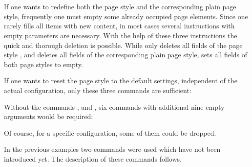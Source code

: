 \begin{Declaration}
  \\
  \\
\end{Declaration}%
%
%
%
If one wants to redefine both the page style  and
the corresponding plain page style, frequently one must empty
some already occupied page elements. Since one rarely fills all items
with new content, in most cases several instructions with empty
parameters are necessary.  With the help of these three instructions
the quick and thorough deletion is possible.  While
 only deletes all fields of the page style
, and  deletes all fields of
the corresponding plain page style, 
sets all fields of both page styles to empty.
\begin{Example}
  If one wants to reset the page style to the default {\KOMAScript}
  settings, independent of the actual configuration, only these three
  commands are sufficient:
\begin{lstcode}
  \clearscrheadfoot
  \ohead{\headmark}
  \ofoot[\pagemark]{\pagemark}
\end{lstcode}
  Without the commands ,
   and , six commands with
  additional nine empty arguments would be required:
\begin{lstcode}
  \ihead[]{}
  \chead[]{}
  \ohead[]{\headmark}
  \ifoot[]{}
  \cfoot[]{}
  \ofoot[\pagemark]{\pagemark}
\end{lstcode}
  Of course, for a specific configuration, some of them could be
  dropped.%
\end{Example}%
%
%
%
%
%
%
%
%
%
%
%

In the previous examples two commands were used which have not been
introduced yet. The description of these commands follows.


